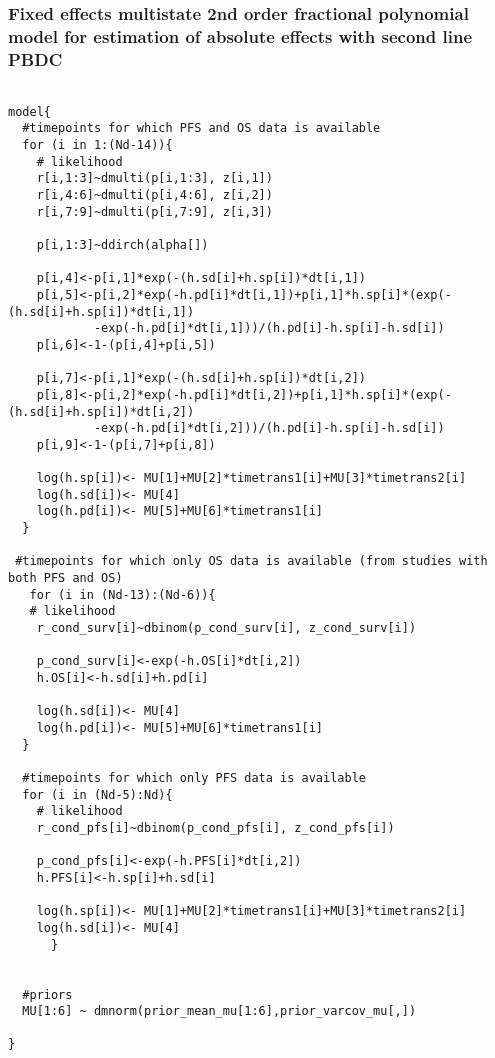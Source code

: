 \documentclass[11pt,final,fleqn]{article}\usepackage[]{graphicx}\usepackage[]{color}
\theoremstyle{plain}
\begin{document}
\begin{appendices}
\begin{verbatim}
\end{verbatim}

\subsubsection{Fixed effects multistate 2nd order fractional polynomial  model for estimation of absolute effects with second line PBDC} 
\begin{verbatim} 

model{
  #timepoints for which PFS and OS data is available
  for (i in 1:(Nd-14)){
    # likelihood
    r[i,1:3]~dmulti(p[i,1:3], z[i,1]) 
    r[i,4:6]~dmulti(p[i,4:6], z[i,2]) 
    r[i,7:9]~dmulti(p[i,7:9], z[i,3]) 
    
    p[i,1:3]~ddirch(alpha[])
    
    p[i,4]<-p[i,1]*exp(-(h.sd[i]+h.sp[i])*dt[i,1])
    p[i,5]<-p[i,2]*exp(-h.pd[i]*dt[i,1])+p[i,1]*h.sp[i]*(exp(-(h.sd[i]+h.sp[i])*dt[i,1])
    		-exp(-h.pd[i]*dt[i,1]))/(h.pd[i]-h.sp[i]-h.sd[i])
    p[i,6]<-1-(p[i,4]+p[i,5])
    
    p[i,7]<-p[i,1]*exp(-(h.sd[i]+h.sp[i])*dt[i,2])
    p[i,8]<-p[i,2]*exp(-h.pd[i]*dt[i,2])+p[i,1]*h.sp[i]*(exp(-(h.sd[i]+h.sp[i])*dt[i,2])
    		-exp(-h.pd[i]*dt[i,2]))/(h.pd[i]-h.sp[i]-h.sd[i])
    p[i,9]<-1-(p[i,7]+p[i,8])
    
    log(h.sp[i])<- MU[1]+MU[2]*timetrans1[i]+MU[3]*timetrans2[i] 
    log(h.sd[i])<- MU[4] 
    log(h.pd[i])<- MU[5]+MU[6]*timetrans1[i]
  }
  
 #timepoints for which only OS data is available (from studies with both PFS and OS)
   for (i in (Nd-13):(Nd-6)){
   # likelihood
    r_cond_surv[i]~dbinom(p_cond_surv[i], z_cond_surv[i]) 
    
    p_cond_surv[i]<-exp(-h.OS[i]*dt[i,2])
    h.OS[i]<-h.sd[i]+h.pd[i]
    
    log(h.sd[i])<- MU[4]
    log(h.pd[i])<- MU[5]+MU[6]*timetrans1[i]
  }
    
  #timepoints for which only PFS data is available 
  for (i in (Nd-5):Nd){
    # likelihood
    r_cond_pfs[i]~dbinom(p_cond_pfs[i], z_cond_pfs[i]) 
    
    p_cond_pfs[i]<-exp(-h.PFS[i]*dt[i,2])
    h.PFS[i]<-h.sp[i]+h.sd[i]
    
    log(h.sp[i])<- MU[1]+MU[2]*timetrans1[i]+MU[3]*timetrans2[i] 
    log(h.sd[i])<- MU[4] 
      }
  
  
  #priors
  MU[1:6] ~ dmnorm(prior_mean_mu[1:6],prior_varcov_mu[,]) 

}


\end{verbatim}
\end{appendices}
\end{document}
